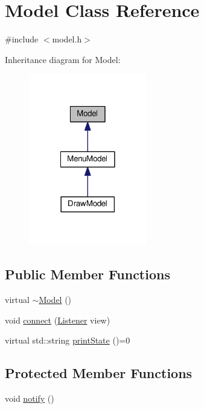 \hypertarget{classModel}{\section{Model Class Reference}
\label{classModel}
}


{\ttfamily \#include $<$model.\-h$>$}



Inheritance diagram for Model\-:
\nopagebreak
\begin{figure}[H]
\begin{center}
\leavevmode
\includegraphics[width=146pt]{classModel__inherit__graph}
\end{center}
\end{figure}
\subsection*{Public Member Functions}
\begin{DoxyCompactItemize}
\item 
virtual \hyperlink{classModel_ad6ebd2062a0b823db841a0b88baac4c0}{$\sim$\-Model} ()
\item 
void \hyperlink{classModel_af12598805e6271d9c64f90d31c15f7d3}{connect} (\hyperlink{model_8h_aac0c1ba55260a4d57385cf6a95c5df0a}{Listener} view)
\item 
virtual std\-::string \hyperlink{classModel_a853995c3960bc17b4df783d76ca5dfeb}{print\-State} ()=0
\end{DoxyCompactItemize}
\subsection*{Protected Member Functions}
\begin{DoxyCompactItemize}
\item 
void \hyperlink{classModel_a9f6a71b1dbc4fb979781f355ae9c78d2}{notify} ()
\end{DoxyCompactItemize}
